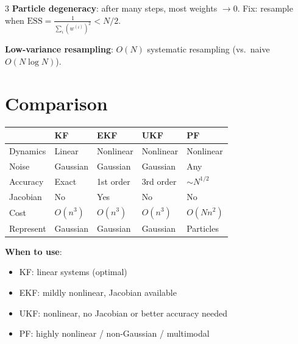 \documentclass[9pt,landscape]{article}
\begin{document}
\begin{multicols}{3}
\textbf{Particle degeneracy}: after many steps, most weights $\to 0$. Fix: resample when $\mathrm{ESS}=\frac{1}{\sum_i(w^{(i)})^2}<N/2$.

\textbf{Low-variance resampling}: $O(N)$ systematic resampling (vs.\ naive $O(N\log N)$).

\section{Comparison}

\begin{tabular}{@{}p{1cm}p{1.1cm}p{1.1cm}p{1.1cm}p{1.4cm}@{}}
\toprule
 & \textbf{KF} & \textbf{EKF} & \textbf{UKF} & \textbf{PF}\\
\midrule
Dynamics & Linear & Nonlinear & Nonlinear & Nonlinear\\
Noise & Gaussian & Gaussian & Gaussian & Any\\
Accuracy & Exact & 1st order & 3rd order & $\sim N^{1/2}$\\
Jacobian & No & Yes & No & No\\
Cost & $O(n^3)$ & $O(n^3)$ & $O(n^3)$ & $O(Nn^2)$\\
Represent & Gaussian & Gaussian & Gaussian & Particles\\
\bottomrule
\end{tabular}

\vspace{4pt}
\textbf{When to use}:
\begin{itemize}
  \item KF: linear systems (optimal)
  \item EKF: mildly nonlinear, Jacobian available
  \item UKF: nonlinear, no Jacobian or better accuracy needed
  \item PF: highly nonlinear / non-Gaussian / multimodal
\end{itemize}

\end{multicols}
\end{document}
